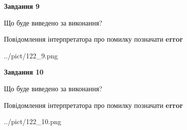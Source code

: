 \documentclass[12pt, ukrainian]{article}
\begin{document}
{{\begin {center}\textbf{Завдання 9}\end {center}}\par
Що буде виведено за виконання? \par
Повідомлення інтерпретатора про помилку позначати \textbf{error}

\begin{center}
	{../pict/122_9.png}
\end{center}
\newpage

{\begin {center}\textbf{Завдання 10}\end {center}}\par
Що буде виведено за виконання? \par
Повідомлення інтерпретатора про помилку позначати \textbf{error}

\begin{center}
	{../pict/122_10.png}
\end{center}
\newpage

}
\end{document}
